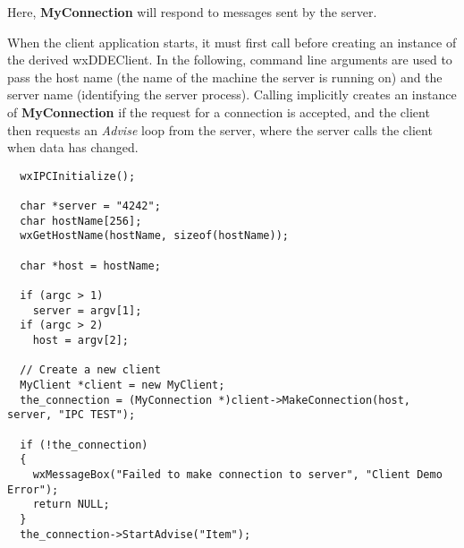 Here, {\bf MyConnection} will respond to  messages sent
by the server.

When the client application starts, it must first call \rtfsp
before creating an instance of the derived wxDDEClient. In the following, command line
arguments are used to pass the host name (the name of the machine the server is running
on) and the server name (identifying the server process). Calling \rtfsp
implicitly creates an instance of {\bf MyConnection} if the request for a
connection is accepted, and the client then requests an {\it Advise} loop
from the server, where the server calls the client when data has changed.

\begin{verbatim}
  wxIPCInitialize();

  char *server = "4242";
  char hostName[256];
  wxGetHostName(hostName, sizeof(hostName));

  char *host = hostName;

  if (argc > 1)
    server = argv[1];
  if (argc > 2)
    host = argv[2];

  // Create a new client
  MyClient *client = new MyClient;
  the_connection = (MyConnection *)client->MakeConnection(host, server, "IPC TEST");

  if (!the_connection)
  {
    wxMessageBox("Failed to make connection to server", "Client Demo Error");
    return NULL;
  }
  the_connection->StartAdvise("Item");
\end{verbatim}


